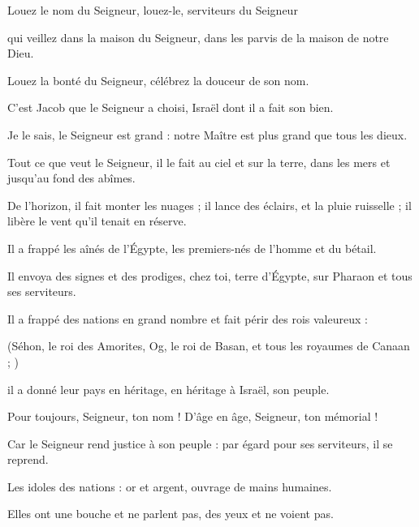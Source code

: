 \item Louez le nom du Seigneur, louez-le, serviteurs du Seigneur

\item qui veillez dans la maison du Seigneur, dans les parvis de la maison de notre Dieu.

\item Louez la bonté du Seigneur, célébrez la douceur de son nom.

\item C'est Jacob que le Seigneur a choisi, Israël dont il a fait son bien.

\item Je le sais, le Seigneur est grand : notre Maître est plus grand que tous les dieux.

\item Tout ce que veut le Seigneur, il le fait au ciel et sur la terre, dans les mers et jusqu'au fond des abîmes.

\item De l'horizon, il fait monter les nuages ; il lance des éclairs, et la pluie ruisselle ; il libère le vent qu'il tenait en réserve.

\item Il a frappé les aînés de l'Égypte, les premiers-nés de l'homme et du bétail.

\item Il envoya des signes et des prodiges, chez toi, terre d'Égypte, sur Pharaon et tous ses serviteurs.

\item Il a frappé des nations en grand nombre et fait périr des rois valeureux :

\item (Séhon, le roi des Amorites, Og, le roi de Basan, et tous les royaumes de Canaan ; )

\item il a donné leur pays en héritage, en héritage à Israël, son peuple.

\item Pour toujours, Seigneur, ton nom ! D'âge en âge, Seigneur, ton mémorial !

\item Car le Seigneur rend justice à son peuple : par égard pour ses serviteurs, il se reprend.

\item Les idoles des nations : or et argent, ouvrage de mains humaines.

\item Elles ont une bouche et ne parlent pas, des yeux et ne voient pas.

